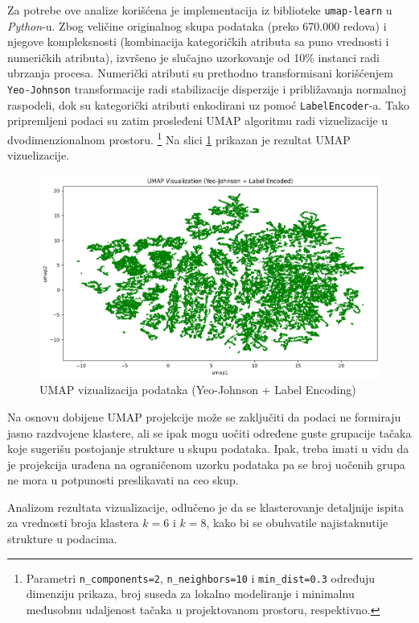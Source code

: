 \documentclass[a4paper,12pt]{article}
\begin{document}
Za potrebe ove analize korišćena je implementacija iz biblioteke \texttt{umap-learn} u \textit{Python}-u. Zbog veličine originalnog skupa podataka (preko 670.000 redova) i njegove kompleksnosti (kombinacija kategoričkih atributa sa puno vrednosti i numeričkih atributa), izvršeno je slučajno uzorkovanje od 10\% instanci radi ubrzanja procesa. Numerički atributi su prethodno transformisani korišćenjem \texttt{Yeo-Johnson} transformacije radi stabilizacije disperzije i približavanja normalnoj raspodeli, dok su kategorički atributi enkodirani uz pomoć \texttt{LabelEncoder}-a. Tako pripremljeni podaci su zatim prosleđeni UMAP algoritmu radi vizuelizacije u dvodimenzionalnom prostoru. \footnote{Parametri \texttt{n\_components=2}, \texttt{n\_neighbors=10} i \texttt{min\_dist=0.3} određuju dimenziju prikaza, broj suseda za lokalno modeliranje i minimalnu međusobnu udaljenost tačaka u projektovanom prostoru, respektivno.} Na slici \ref{Slika:umap} prikazan je rezultat UMAP vizuelizacije.
\begin{figure}[htbp]
    	\centering
    	\includegraphics[width=1\textwidth]{./images/umap.png}
    	\caption{UMAP vizualizacija podataka (Yeo-Johnson + Label Encoding)}
    	\label{Slika:umap}
\end{figure}

Na osnovu dobijene UMAP projekcije može se zaključiti da podaci ne formiraju jasno razdvojene klastere, ali se ipak mogu uočiti određene guste grupacije tačaka koje sugerišu postojanje strukture u skupu podataka. Ipak, treba imati u vidu da je projekcija urađena na ograničenom uzorku podataka pa se broj uočenih grupa ne mora u potpunosti preslikavati na ceo skup. 

Analizom rezultata vizualizacije, odlučeno je da se klasterovanje detaljnije ispita za vrednosti broja klastera $k = 6$ i $k = 8$, kako bi se obuhvatile najistaknutije strukture u podacima.
\end{document}
